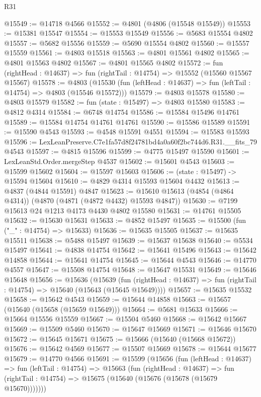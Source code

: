 \begin{lexlean}{R31}
\begin{coremodule}
@15549 := @14718 @4566
@15552 := @4801 (@4806 (@15548 @15549))
@15553 := @15381 @15547
@15554 := @15553 @15549
@15556 := @5683 @15554 @4802
@15557 := @5682 @15556
@15559 := @5690 @15554 @4802
@15560 := @15557 @15559
@15561 := @4803 @15518
@15563 := @4801 @15561 @4802
@15565 := @4801 @15563 @4802
@15567 := @4801 @15565 @4802
@15572 := fun (rightHead : @14637) => fun (rightTail : @14754) => @15552 (@15560 @15567 @15567)
@15578 := @4803
    (@15530 (fun (leftHead : @14637) => fun (leftTail : @14754) => @4803 (@15546 @15572)))
@15579 := @4803 @15578
@15580 := @4803 @15579
@15582 := fun (state : @15497) => @4803 @15580
@15583 := @4812 @4314
@15584 := @6748 @14754
@15586 := @15584 @15496 @14761
@15589 := @15584 @14754 @14761 @14761
@15590 := @15586 @15589
@15591 := @15590 @4543
@15593 := @4548 @15591 @4551
@15594 := @15583 @15593
@15596 := LexLeanPreserve.C7e1fa57d8f24781bd4a0a60f2bc744d6.R31.__fits_79 @4543
@15597 := @4815 @15596
@15599 := @4775 @15497 @15590
@15601 := LexLeanStd.Order.mergeStep @4537
@15602 := @15601 @4543
@15603 := @15599 @15602
@15604 := @15597 @15603
@15606 := (state : @15497) -> @15594 @15604
@15610 := @4829 @4314 @15593 @15604 @4432
@15613 := @4837 (@4844 @15591) @4847
@15623 := @15610 @15613 (@4854 (@4864 @4314)) (@4870 (@4871 (@4872 @4432) @15593 @4847))
@15630 := @7199 @15613 @24 @1213 @4173 @4430 @4802 @15580
@15631 := @14761 @15505
@15632 := @15630 @15631
@15633 := @4852 @15497
@15635 := @15500 (fun ("_" : @14754) => @15633)
@15636 := @15635 @15505
@15637 := @15635 @15511
@15638 := @5488 @15497
@15639 := @15637 @15638
@15640 := @5534 @15497
@15641 := @4838 @14754
@15642 := @15641 @15496
@15643 := @15642 @14858
@15644 := @15641 @14754
@15645 := @15644 @4543
@15646 := @14770 @4557
@15647 := @15508 @14754
@15648 := @15647 @15531
@15649 := @15646 @15648
@15656 := @15636
    (@15639
      (fun (rightHead : @14637) => fun (rightTail : @14754) => @15640 (@15643 (@15645 @15649))))
@15657 := @15635 @15532
@15658 := @15642 @4543
@15659 := @15644 @14858
@15663 := @15657 (@15640 (@15658 (@15659 @15649)))
@15664 := @5681 @15633
@15666 := @15664 @15556 @15559
@15667 := @15504 @5460
@15668 := @15642 @15667
@15669 := @15509 @5460
@15670 := @15647 @15669
@15671 := @15646 @15670
@15672 := @15645 @15671
@15675 := @15666 (@15640 (@15668 @15672))
@15676 := @15642 @4569
@15677 := @15507 @15669
@15678 := @15644 @15677
@15679 := @14770 @4566
@15691 := @15599
    (@15656
      (fun (leftHead : @14637) =>
      fun (leftTail : @14754) =>
      @15663
        (fun (rightHead : @14637) =>
        fun (rightTail : @14754) => @15675 (@15640 (@15676 (@15678 (@15679 @15670)))))))

\end{coremodule}
\end{lexlean}
